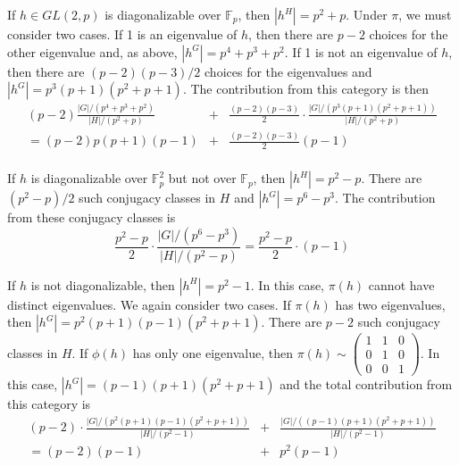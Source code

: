 \documentclass[12pt,letterpaper]{article}
\begin{document}
If $h\in GL(2,p)$ is diagonalizable over $\mathbb{F}_p$, then
$|h^H|=p^2+p$. Under $\pi$, we must consider two cases. If 1 is an
eigenvalue of $h$, then there are $p-2$ choices for the other
eigenvalue and, as above, $|h^G|=p^4+p^3+p^2$. If 1 is not an
eigenvalue of $h$, then there are $(p-2)(p-3)/2$ choices for the
eigenvalues and $|h^G|=p^3(p+1)(p^2+p+1)$. The contribution from this
category is then 
\begin{eqnarray*}
     (p-2)\frac{|G|/(p^4+p^3+p^2)}{|H|/(p^2+p)} & + &
  \frac{(p-2)(p-3)}{2}\cdot\frac{|G|/(p^3(p+1)(p^2+p+1))}{|H|/(p^2+p)}\\
   = (p-2)p(p+1)(p-1) & + & \frac{(p-2)(p-3)}{2} (p-1)\\
\end{eqnarray*}

If $h$ is diagonalizable over $\mathbb{F}_p^2$ but not over
$\mathbb{F}_p$, then $|h^H|= p^2-p$. There are $(p^2-p)/2$ such
conjugacy classes in $H$ and $|h^G| = p^6-p^3$. The contribution from
these conjugacy classes is
$$ \frac{p^2-p}{2}\cdot\frac{|G|/(p^6-p^3)}{|H|/(p^2-p)} =
\frac{p^2-p}{2}\cdot (p-1)$$

If $h$ is not diagonalizable, then $|h^H|=p^2-1$. In this case, $\pi(h)$
cannot have distinct eigenvalues. We again consider two cases. If
$\pi(h)$ has two eigenvalues, then $|h^G|= p^2(p+1)(p-1)(p^2+p+1)$. There are
$p-2$ such conjugacy classes in $H$. If $\phi(h)$ has only one
eigenvalue, then $\pi(h)\sim \left(\begin{array}{ccc}1 & 1 &0\\ 0 & 1 &
  0\\ 0 & 0 & 1\end{array}\right)$. In this case,
$|h^G|=(p-1)(p+1)(p^2+p+1)$ and the total contribution from this
category is 
\begin{eqnarray*}
  (p-2)\cdot\frac{|G|/(p^2(p+1)(p-1)(p^2+p+1))}{|H|/(p^2-1)} & + &
  \frac{|G|/((p-1)(p+1)(p^2+p+1))}{|H|/(p^2-1)}\\
 = (p-2)(p-1) & + & p^2(p-1)\\
\end{eqnarray*}
\end{document}

